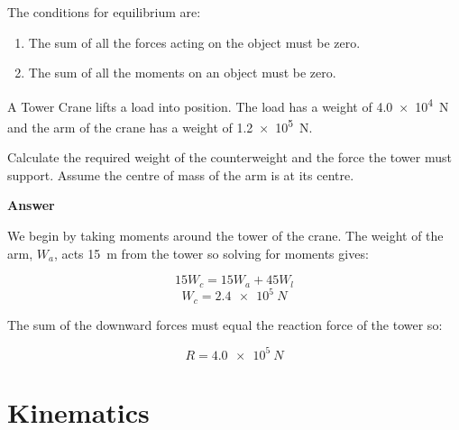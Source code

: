 \documentclass[revision-guide.tex]{subfiles}
\begin{document}
The conditions for equilibrium are:
\begin{enumerate}
	\item The sum of all the forces acting on the object must be zero.
	\item The sum of all the moments on an object must be zero.
\end{enumerate}
\begin{example}
	A Tower Crane lifts a load into position. The load has a weight of \SI{4.0e4}{N} and the arm of the crane has a weight of \SI{1.2e5}{N}.

	Calculate the required weight of the counterweight and the force the tower must support. Assume the centre of mass of the arm is at its centre.

	\vspace{1cm}

		\begin{center}
		\end{center}

		\textbf{Answer}

		We begin by taking moments around the tower of the crane. The weight of the arm, $W_a$, acts \SI{15}{m} from the tower so solving for moments gives:

		$$ 15W_c = 15W_a + 45W_l $$
		$$ W_c = \SI{2.4e5}{N} $$

		The sum of the downward forces must equal the reaction force of the tower so:

		$$ R = \SI{4.0e5}{N} $$
\end{example}

\section{Kinematics}
\end{document}
